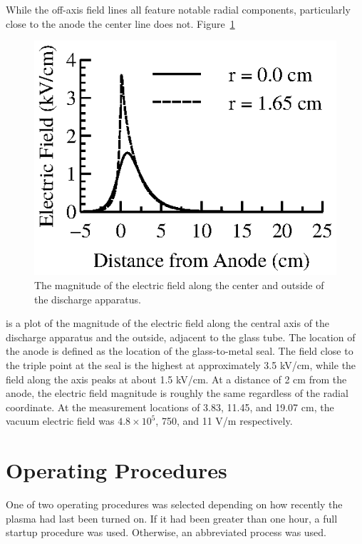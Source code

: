 While the off-axis field lines all feature notable radial components,
particularly close to the anode the center line does not.
Figure~\ref{fig:centere}
\begin{figure}
  \centering
  \includegraphics{./chapters/experiment/figures/centere.eps}
  \caption{The magnitude of the electric field along the center and outside of
  the discharge apparatus.}
  \label{fig:centere}
\end{figure}
is a plot of the magnitude of the electric field along the central axis of the
discharge apparatus and the outside, adjacent to the glass tube. The location of
the anode is defined as the location of the glass-to-metal seal. The field close
to the triple point at the seal is the highest at approximately 3.5 kV/cm, while
the field along the axis peaks at about 1.5 kV/cm. At a distance of 2 cm from
the anode, the electric field magnitude is roughly the same regardless of the
radial coordinate. At the measurement locations of 3.83, 11.45, and 19.07 cm,
the vacuum electric field was $4.8 \times 10^5$, 750, and 11 V/m respectively. 

\section{Operating Procedures}

One of two operating procedures was selected depending on how recently the
plasma had last been turned on. If it had been greater than one hour, a full
startup procedure was used. Otherwise, an abbreviated process was used. 

